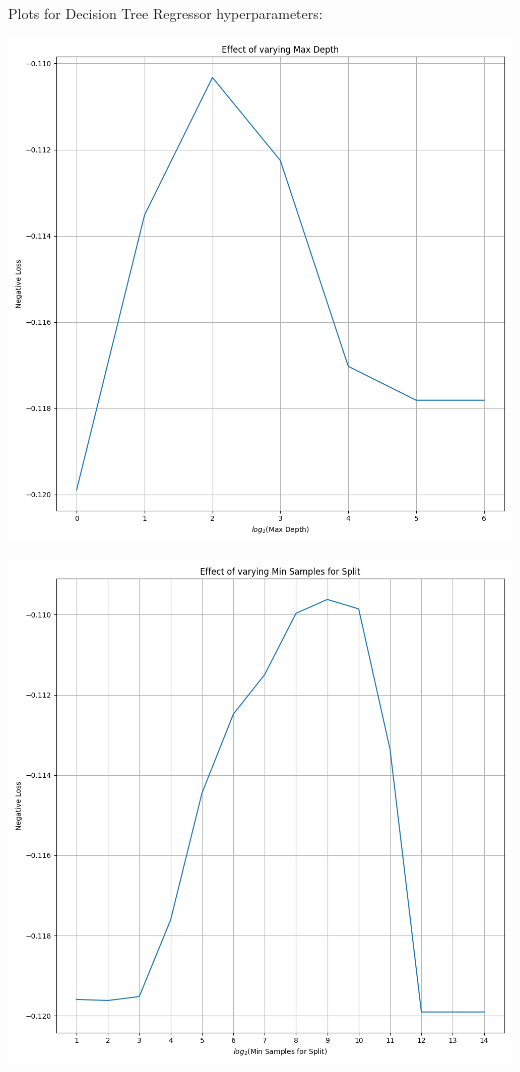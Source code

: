 \documentclass[12pt, letterpaper]{article}
\begin{document}
\newcommand{\myscale}{0.4}

Plots for Decision Tree Regressor hyperparameters:

\includegraphics[scale=\myscale]{decision_tree_regressor_Max Depth.png}

\includegraphics[scale=\myscale]{decision_tree_regressor_Min Samples for Split.png}
\end{document}
